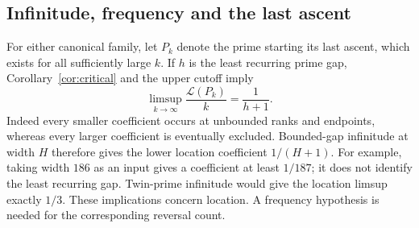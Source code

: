 \documentclass[11pt]{article}
\theoremstyle{definition}
\newcommand{\LL}{\mathcal L}
\begin{document}
\subsection{Infinitude, frequency and the last ascent}
For either canonical family, let $P_k$ denote the prime starting its
last ascent, which exists for all sufficiently large $k$.
If $h$ is the least recurring prime gap, Corollary~\ref{cor:critical}
and the upper cutoff imply
\[
 \limsup_{k\to\infty}\frac{\LL(P_k)}{k}=\frac1{h+1}.
\]
Indeed every smaller coefficient occurs at unbounded ranks and
endpoints, whereas every larger coefficient is eventually excluded.
Bounded-gap infinitude at width $H$ therefore gives the lower
location coefficient $1/(H+1)$. For example, taking width $186$
as an input gives a coefficient at least $1/187$; it does not identify
the least recurring gap. Twin-prime infinitude would give the
location limsup exactly $1/3$. These implications concern location.
A frequency hypothesis is needed for the corresponding reversal count.
\end{document}
